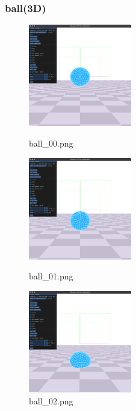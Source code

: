 \documentclass[a4paper,10pt,uplatex,dvipdfmx]{jsarticle}
\begin{document}
\subsubsection{ball(3D)}
\begin{figure}[H]
  \begin{minipage}{0.33\hsize}
    \begin{center}
      \includegraphics[width=45mm]{img/ball_00.png}
      \caption{ball\_00.png}
    \end{center}
  \end{minipage}
  \begin{minipage}{0.33\hsize}
    \begin{center}
      \includegraphics[width=45mm]{img/ball_01.png}
      \caption{ball\_01.png}
    \end{center}
  \end{minipage}
  \begin{minipage}{0.33\hsize}
    \begin{center}
      \includegraphics[width=45mm]{img/ball_02.png}
      \caption{ball\_02.png}
    \end{center}
  \end{minipage}
\end{figure}
\end{document}

